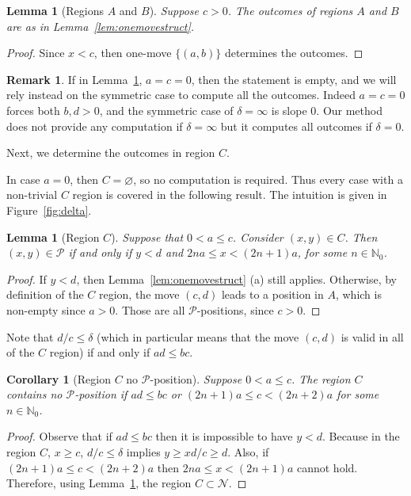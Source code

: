 \documentclass{amsart}
\theoremstyle{plain}
\newtheorem{cor}[thm]{Corollary}
\newtheorem{lem}[thm]{Lemma}
\theoremstyle{definition}
\newtheorem{rem}[thm]{Remark}
\newcommand{\N}{\ensuremath{\mathcal N}}
\renewcommand{\P}{\ensuremath{\mathcal P}}
\newcommand{\nz}{\mathbb N_0}
\renewcommand{\ge}{\geqslant}
\renewcommand{\le}{\leqslant}
\begin{document}
\begin{lem}[Regions $A$ and $B$]\label{lem:AB}
Suppose $c>0$. The outcomes of regions $A$ and $B$ are as in Lemma~\ref{lem:onemovestruct}.
\end{lem}
\begin{proof}
    Since $x<c$, then {\sc one-move} $\{(a,b)\}$  determines the outcomes.
\end{proof}

\begin{rem}
\label{rem:two_move_a,c=0}
If in Lemma~\ref{lem:AB}, $a=c=0$, then the statement is empty, and we will rely instead on the symmetric case to compute all the outcomes. Indeed $a=c=0$ forces both $b,d>0$, and the symmetric case of $\delta=\infty$ is slope $0$. Our method does not provide any computation if $\delta=\infty$ but it computes all outcomes if $\delta=0$. 
\end{rem}



Next, we determine the outcomes in region $C$. 

In case $a=0$, then $C=\varnothing$, so no computation is required.  Thus every case with a non-trivial $C$ region is covered in the following result. The intuition is given in Figure~\ref{fig:delta}. 




\begin{lem}[Region $C$]\label{lem:C}
      Suppose that $0<a\le c$. Consider $(x,y)\in C$. Then $(x,y)\in \P$ if and only if $y<d$ and $2na\le x< (2n+1)a$, for some $n\in \nz$.
\end{lem}
\begin{proof}
If $y<d$, then Lemma~\ref{lem:onemovestruct} (a) still applies. Otherwise, by definition of the $C$ region, the move $(c,d)$ leads to a position in $A$, which is non-empty since $a>0$. Those are all \P-positions, since $c>0$. 
    
\end{proof}
Note that $d/c\le \delta$ (which in particular means that the move $(c,d)$ is valid in all of the $C$ region) if and only if $ad\le bc$. 

\begin{cor}[Region $C$ no \P-position]
\label{cor:C_region_noP}
Suppose $0<a\le c$. The region $C$ contains no \P-position if %
$ad\le bc$ or $(2n+1)a\le c<(2n+2)a$ for some $n\in \nz$.
\end{cor}

\begin{proof}
  Observe that if $ad\le bc$  then it is impossible to have $y< d$. Because  in the region $C$,  $x \ge c$,  $d/c \le \delta$ implies $y \ge x d/c\ge d$. Also, if $(2n+1)a\le c<(2n+2)a$ then $2na\le x<(2n+1)a$ cannot hold. Therefore, using Lemma~\ref{lem:C},  the region $C \subset \N$.
\end{proof}
\end{document}
